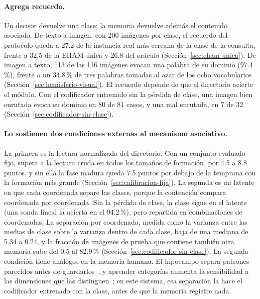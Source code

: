 \paragraph{Agrega recuerdo.}
Un decisor devuelve una clase; la memoria devuelve además el contenido asociado.
De texto a imagen, con 200 imágenes por clase, el recuerdo del protocolo queda a 27.2
de la instancia real más cercana de la clase de la consulta, frente a 32.5 de la EHAM
única y 26.8 del oráculo (Sección~\ref{sec:eham-unica}).
De imagen a texto, 113 de las 116 imágenes evocan una palabra de su dominio (97.4\,\%),
frente a un 34.8\,\% de tres palabras tomadas al azar de los ocho vocabularios
(Sección~\ref{sec:hemisferio-visual}).
El recuerdo depende de que el directorio acierte el módulo.
Con el codificador entrenado sin la pérdida de clase, una imagen bien enrutada evoca su
dominio en 80 de 81 casos, y una mal enrutada, en 7 de 32
(Sección~\ref{sec:codificador-sin-clase}).

\paragraph{Lo sostienen dos condiciones externas al mecanismo asociativo.}
La primera es la lectura normalizada del directorio.
Con un conjunto evaluado fijo, supera a la lectura cruda en todos los tamaños de
formación, por 4.5 a 8.8 puntos, y sin ella la fase madura queda 7.5 puntos por debajo
de la temprana con la formación más grande (Sección~\ref{sec:calibracion-fija}).
La segunda es un latente en que cada coordenada separe las clases, porque la contención
compara coordenada por coordenada.
Sin la pérdida de clase, la clase sigue en el latente (una sonda lineal la acierta en
el 94.2\,\%), pero repartida en combinaciones de coordenadas.
La separación por coordenada, medida como la varianza entre las medias de clase sobre la
varianza dentro de cada clase, baja de una mediana de 5.34 a 0.24, y la fracción de
imágenes de prueba que contiene también otra memoria sube del 0.5 al 82.9\,\%
(Sección~\ref{sec:codificador-sin-clase}).
La segunda condición tiene análogos en la memoria humana.
El hipocampo separa patrones parecidos antes de guardarlos~\cite{yassa2011pattern}, y
aprender categorías aumenta la sensibilidad a las dimensiones que las
distinguen~\cite{goldstone1994influences}; en este sistema, esa separación la hace el
codificador entrenado con la clase, antes de que la memoria registre nada.

